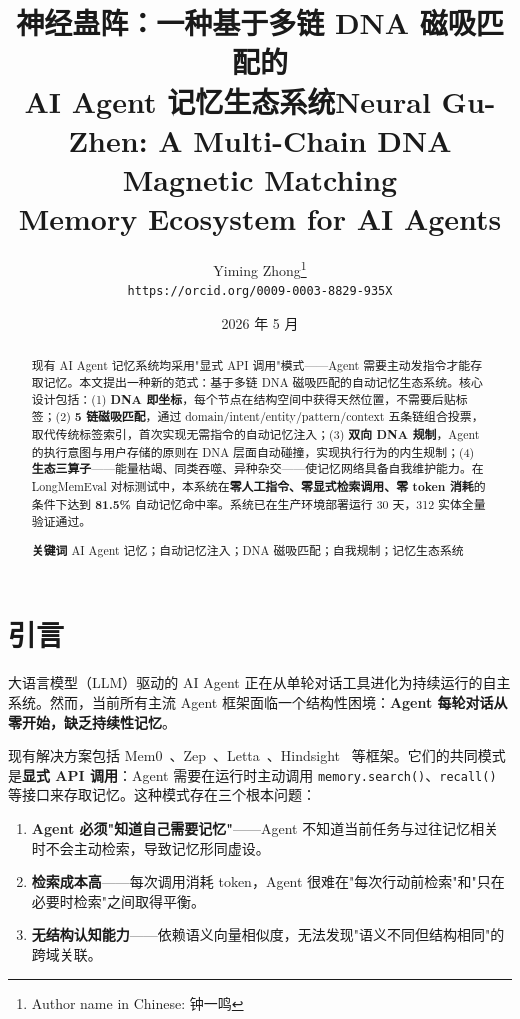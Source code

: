 \documentclass[11pt,a4paper]{article}
\title{神经蛊阵：一种基于多链 DNA 磁吸匹配的\\AI Agent 记忆生态系统}
\title{Neural Gu-Zhen: A Multi-Chain DNA Magnetic Matching\\Memory Ecosystem for AI Agents}
\author{
  Yiming Zhong\thanks{Author name in Chinese: 钟一鸣} \\
  \texttt{https://orcid.org/0009-0003-8829-935X}
}
\date{2026 年 5 月}
\begin{document}
\maketitle

\begin{abstract}
现有 AI Agent 记忆系统均采用"显式 API 调用"模式——Agent 需要主动发指令才能存取记忆。本文提出一种新的范式：基于多链 DNA 磁吸匹配的自动记忆生态系统。核心设计包括：(1) \textbf{DNA 即坐标}，每个节点在结构空间中获得天然位置，不需要后贴标签；(2) \textbf{5 链磁吸匹配}，通过 domain/intent/entity/pattern/context 五条链组合投票，取代传统标签索引，首次实现无需指令的自动记忆注入；(3) \textbf{双向 DNA 规制}，Agent 的执行意图与用户存储的原则在 DNA 层面自动碰撞，实现执行行为的内生规制；(4) \textbf{生态三算子}——能量枯竭、同类吞噬、异种杂交——使记忆网络具备自我维护能力。在 LongMemEval 对标测试中，本系统在\textbf{零人工指令、零显式检索调用、零 token 消耗}的条件下达到 \textbf{81.5\%} 自动记忆命中率。系统已在生产环境部署运行 30 天，312 实体全量验证通过。

\vspace{0.5em}
\noindent\textbf{关键词} AI Agent 记忆；自动记忆注入；DNA 磁吸匹配；自我规制；记忆生态系统
\end{abstract}

\section{引言}

大语言模型（LLM）驱动的 AI Agent 正在从单轮对话工具进化为持续运行的自主系统。然而，当前所有主流 Agent 框架面临一个结构性困境：\textbf{Agent 每轮对话从零开始，缺乏持续性记忆}。

现有解决方案包括 Mem0~\cite{mem0}、Zep~\cite{zep}、Letta~\cite{letta}、Hindsight~\cite{hindsight} 等框架。它们的共同模式是\textbf{显式 API 调用}：Agent 需要在运行时主动调用 \texttt{memory.search()}、\texttt{recall()} 等接口来存取记忆。这种模式存在三个根本问题：

\begin{enumerate}
  \item \textbf{Agent 必须"知道自己需要记忆"}——Agent 不知道当前任务与过往记忆相关时不会主动检索，导致记忆形同虚设。
  \item \textbf{检索成本高}——每次调用消耗 token，Agent 很难在"每次行动前检索"和"只在必要时检索"之间取得平衡。
  \item \textbf{无结构认知能力}——依赖语义向量相似度，无法发现"语义不同但结构相同"的跨域关联。
\end{enumerate}
\end{document}
